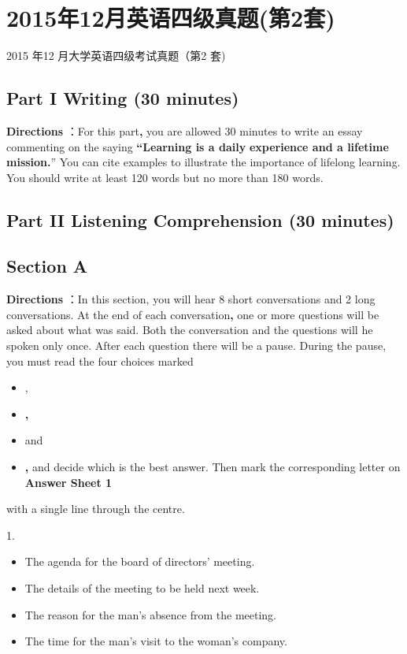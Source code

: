 \documentclass[UTF8,11pt]{ctexart}
\begin{document}
\section*{2015年12月英语四级真题(第2套)}
2015 年12 月大学英语四级考试真题（第2 套)


\subsection*{\textbf{Part I} \textbf{Writing} \textbf{(30 minutes)}}


\textbf{Directions} ：For this part\textbf{,} you are allowed 30 minutes to write an essay commenting on the saying\textbf{ “Learning is a daily} \textbf{experience and a lifetime mission.}” You can cite examples to illustrate the importance of lifelong learning. You should write at least 120 words but no more than 180 words.


\subsection*{\textbf{Part II} \textbf{Listening Comprehension} \textbf{(30 minutes)}}


\subsection*{\textbf{Section A}}


\textbf{Directions} ：In this section, you will hear 8 short conversations and 2 long conversations. At the end of each conversation\textbf{,} one or more questions will be asked about what was said. Both the conversation and the questions will he spoken only once. After each question there will be a pause. During the pause, you must read the four choices marked


\begin{itemize}[leftmargin=2em,itemsep=.2em,topsep=.4em]\item[A.] ,
\item[B.] \textbf{,}
\item[C.] and
\item[D.] \textbf{,} and decide which is the best answer. Then mark the corresponding letter on\textbf{ Answer Sheet 1}
\end{itemize}

with a single line through the centre.


1.


\begin{itemize}[leftmargin=2em,itemsep=.2em,topsep=.4em]\item[A.] The agenda for the board of directors’ meeting.
\item[B.] The details of the meeting to be held next week.
\item[C.] The reason for the man’s absence from the meeting.
\item[D.] The time for the man’s visit to the woman’s company.
\end{itemize}
\end{document}
